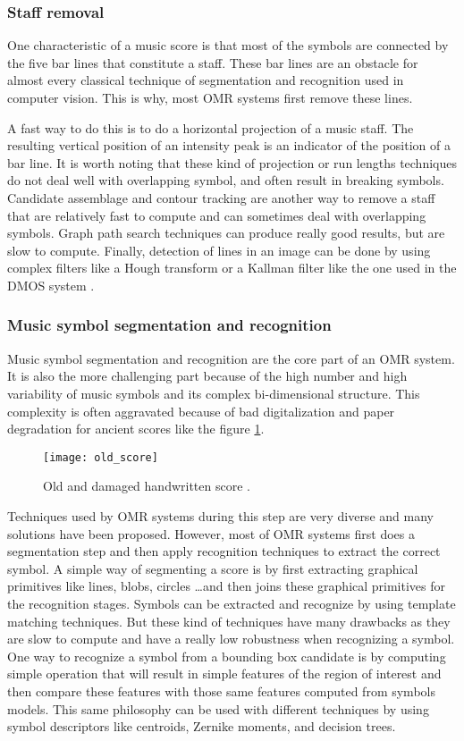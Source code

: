 \documentclass[11pt]{sdm}
\begin{document}
\subsubsection{Staff removal}

One characteristic of a music score is that most of the symbols are connected by the five bar lines that constitute a staff.
These bar lines are an obstacle for almost every classical technique of segmentation and recognition used in computer vision.
This is why, most OMR systems first remove these lines.

A fast way to do this is to do a horizontal projection of a music staff.
The resulting vertical position of an intensity peak is an indicator of the position of a bar line.
It is worth noting that these kind of projection or run lengths techniques do not deal well with overlapping symbol, and often result in breaking symbols.
Candidate assemblage and contour tracking are another way to remove a staff that are relatively fast to compute and can sometimes deal with overlapping symbols.
Graph path search techniques can produce really good results, but are slow to compute.
Finally, detection of lines in an image can be done by using complex filters like a Hough transform or a Kallman filter like the one used in the DMOS system \cite{couasnon_dmos_2001}.

\subsubsection{Music symbol segmentation and recognition}

Music symbol segmentation and recognition are the core part of an OMR system.
It is also the more challenging part because of the high number and high variability of music symbols and its complex bi-dimensional structure.
This complexity is often aggravated because of bad digitalization and paper degradation for ancient scores like the figure \ref{old_score}.
\begin{figure}[btp]
  \texttt{[image: old\_score]}
  \caption{\label{old_score} Old and damaged handwritten score \cite{fornes_analysis_2014}. }
\end{figure}

Techniques used by OMR systems during this step are very diverse and many solutions have been proposed.
However, most of OMR systems first does a segmentation step and then apply recognition techniques to extract the correct symbol.
A simple way of segmenting a score is by first extracting graphical primitives like lines, blobs, circles \ldots and then joins these graphical primitives for the recognition stages.
Symbols can be extracted and recognize by using template matching techniques.
But these kind of techniques have many drawbacks as they are slow to compute and have a really low robustness when recognizing a symbol.
One way to recognize a symbol from a bounding box candidate is by computing simple operation that will result in simple features of the region of interest and then compare these features with those same features computed from symbols models.
This same philosophy can be used with different techniques by using symbol descriptors like centroids, Zernike moments, and decision trees.
\end{document}
